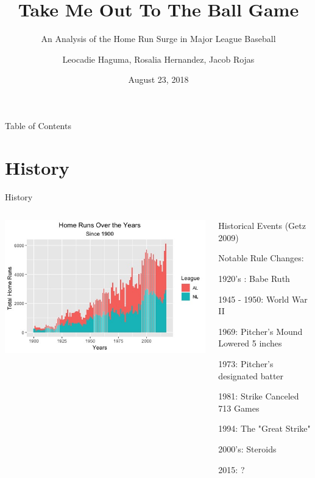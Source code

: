 \documentclass[14pt]{bredelebeamer}
\title[RUSIS @ OSU]{Take Me Out To The Ball Game}
\subtitle{An Analysis of the Home Run Surge in Major League Baseball}
\author{Leocadie Haguma, Rosalia Hernandez, Jacob Rojas\qquad}
\institute{RUSIS @ Oregon State University}
\date{August 23, 2018}
\begin{document}

\begin{frame}
  \titlepage
\end{frame}


\begin{frame}{Table of Contents}
  \tableofcontents
\end{frame}


\section{History}
\begin{frame}{History}
\begin{columns}

\begin{column}{0.7\textwidth}
\includegraphics[scale = 0.42]{Graphs/Rplot}
\end{column}

\begin{column}{0.5\textwidth}

Historical Events (Getz 2009)

Notable Rule Changes:

\begin{itemize}
\begin{small}
\item 1920's : Babe Ruth
\item 1945 - 1950: World War II
\item 1969: Pitcher's Mound Lowered 5 inches
\item 1973: Pitcher's designated batter
\item 1981: Strike Canceled 713 Games
\item 1994: The "Great Strike" 
\item 2000's: Steroids
\item 2015: ?
\end{small}
\end{itemize}
\end{column}
\end{columns}
\end{frame}
\end{document}
